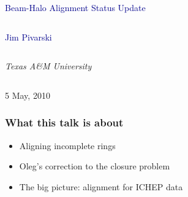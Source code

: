 \documentclass[compress]{beamer}
\begin{document}
\begin{frame}
\vfill
\begin{center}
\textcolor{darkblue}{\Large Beam-Halo Alignment Status Update}

\vfill
\begin{columns}
\begin{center}
\large
\textcolor{darkblue}{Jim Pivarski}
\end{center}
\end{columns}

\begin{columns}
\begin{center}
\scriptsize
{\it Texas A\&M University}
\end{center}
\end{columns}

\vfill
 5 May, 2010

\end{center}
\end{frame}


\small

\begin{frame}
\frametitle{What this talk is about}
\begin{itemize}\setlength{\itemsep}{0.75 cm}
\item Aligning incomplete rings

\item Oleg's correction to the closure problem

\item The big picture: alignment for ICHEP data
\end{itemize}
\end{frame}
\end{document}
